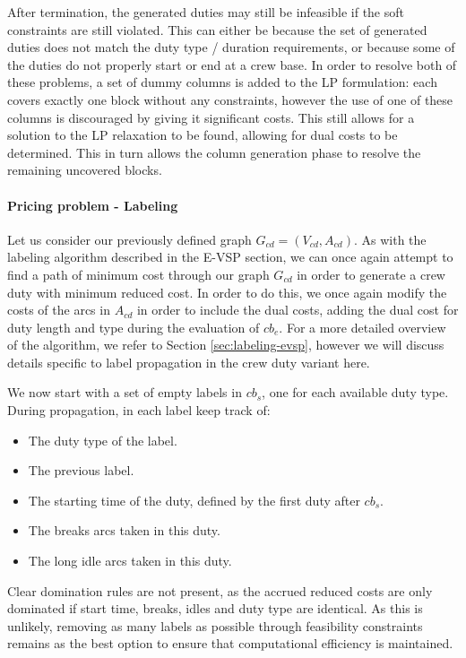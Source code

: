 \documentclass[]{article}
\begin{document}
\noindent After termination, the generated duties may still be infeasible if the soft constraints are still violated. This can either be because the set of generated duties does not match the duty type / duration requirements, or because some of the duties do not properly start or end at a crew base. In order to resolve both of these problems, a set of dummy columns is added to the LP formulation: each covers exactly one block without any constraints, however the use of one of these columns is discouraged by giving it significant costs. This still allows for a solution to the LP relaxation to be found, allowing for dual costs to be determined. This in turn allows the column generation phase to resolve the remaining uncovered blocks.

\paragraph{Pricing problem - Labeling}
Let us consider our previously defined graph $G_{cd} = (V_{cd}, A_{cd})$. As with the labeling algorithm described in the E-VSP section, we can once again attempt to find a path of minimum cost through our graph $G_{cd}$ in order to generate a crew duty with minimum reduced cost. In order to do this, we once again modify the costs of the arcs in $A_{cd}$ in order to include the dual costs, adding the dual cost for duty length and type during the evaluation of $cb_e$. For a more detailed overview of the algorithm, we refer to Section \ref{sec:labeling-evsp}, however we will discuss details specific to label propagation in the crew duty variant here. 

We now start with a set of empty labels in $cb_s$, one for each available duty type. During propagation, in each label keep track of:
\begin{itemize}
  \item The duty type of the label.
  \item The previous label.
  \item The starting time of the duty, defined by the first duty after $cb_s$.
  \item The breaks arcs taken in this duty.
  \item The long idle arcs taken in this duty.
\end{itemize}
Clear domination rules are not present, as the accrued reduced costs are only dominated if start time, breaks, idles and duty type are identical. As this is unlikely, removing as many labels as possible through feasibility constraints remains as the best option to ensure that computational efficiency is maintained.
\end{document}
